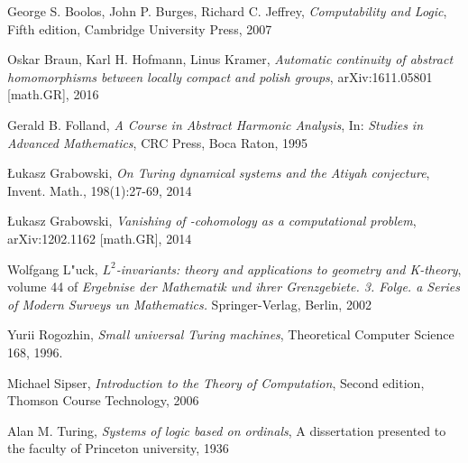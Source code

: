 \begin{thebibliography}{1}

	George S. Boolos, John P. Burges, Richard C. Jeffrey,
	\emph{Computability and Logic},
	Fifth edition,
	Cambridge University Press,
	2007

	Oskar Braun, Karl H. Hofmann, Linus Kramer,
	\emph{Automatic continuity of abstract homomorphisms between locally compact and polish groups},
	arXiv:1611.05801 [math.GR],
	2016

	Gerald B. Folland,
	\emph{A Course in Abstract Harmonic Analysis},
	In: \emph{Studies in Advanced Mathematics},
	CRC Press,
	Boca Raton,
	1995

	\L{}ukasz Grabowski,
	\emph{On Turing dynamical systems and the Atiyah conjecture},
	Invent. Math., 198(1):27-69,
	2014

	\L{}ukasz Grabowski,
	\emph{Vanishing of \ltwo-cohomology as a computational problem},
	arXiv:1202.1162 [math.GR],
	2014

	Wolfgang L"uck,
	\emph{$L^2$-invariants: theory and applications to geometry and K-theory},
	volume 44 of \emph{Ergebnise der Mathematik und ihrer Grenzgebiete. 3. Folge. a Series of Modern Surveys un Mathematics.}
	Springer-Verlag, Berlin,
	2002

	Yurii Rogozhin,
	\emph{Small universal Turing machines},
	Theoretical Computer Science 168,
	1996.

	Michael Sipser,
	\emph{Introduction to the Theory of Computation},
	Second edition,
	Thomson Course Technology,
	2006

	Alan M. Turing,
	\emph{Systems of logic based on ordinals},
	A dissertation presented to the faculty of Princeton university,
	1936

\end{thebibliography}
